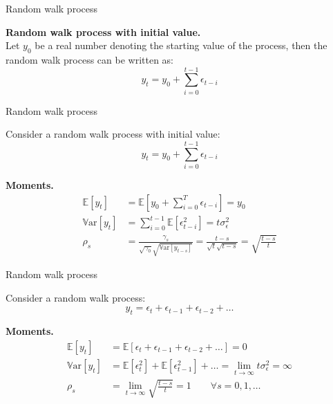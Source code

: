 \documentclass[notes,blackandwhite,mathsans]{beamer}
\begin{document}
\begin{frame}{Random walk process}

\textbf{Random walk process with initial value.}\\
{\color{mcxs2}Let} $y_0$ {\color{mcxs2}be a real number denoting the} {\color{mcxs2}starting value} {\color{mcxs2}of the process, then the random walk process can be written as:}
$$ y_t = y_0 +  \sum_{i=0}^{t-1} \epsilon_{t-i} $$

\end{frame}




\begin{frame}{Random walk process }

{\color{mcxs2}Consider a random walk process with} {\color{mcxs2}initial value:}
$$ y_t = y_0 +  \sum_{i=0}^{t-1} \epsilon_{t-i} $$

\bigskip\textbf{Moments.}
\begin{align*}
\mathbb{E}[y_t] &= \mathbb{E}[y_0 +  \sum_{i=0}^{T} \epsilon_{t-i}] = y_0 \\
\mathbb{V}\text{ar}[y_t] &= \sum_{i=0}^{t-1} \mathbb{E}[\epsilon_{t-i}^2] =  t\sigma_{\epsilon}^2 \\
\rho_s &= \frac{\gamma_s}{\sqrt{\gamma_0}\sqrt{\mathbb{V}\text{ar}[y_{t-s}]}} = \frac{t-s}{\sqrt{t}\sqrt{t-s}} = \sqrt{\frac{t-s}{t}}
\end{align*}


\end{frame}






\begin{frame}{Random walk process}

{\color{mcxs2}Consider a} {\color{mcxs2}random walk process:}
$$ y_t = \epsilon_t + \epsilon_{t-1} + \epsilon_{t-2} + \dots $$

\vspace{0.3cm}\textbf{Moments.}
\begin{align*}
\mathbb{E}[y_t] &= \mathbb{E}[\epsilon_t + \epsilon_{t-1} + \epsilon_{t-2} + \dots] = 0 \\[2ex]
\mathbb{V}\text{ar}[y_t] &= \mathbb{E}[\epsilon_t^2] + \mathbb{E}[\epsilon_{t-1}^2] +\dots = \lim_{t\rightarrow\infty}t\sigma_{\epsilon}^2= \infty \\[2ex]
\rho_s &= \lim_{t\rightarrow\infty}\sqrt{\frac{t-s}{t}} =  1 \qquad \forall s=0,1, \dots
\end{align*}

\end{frame}
\end{document}
